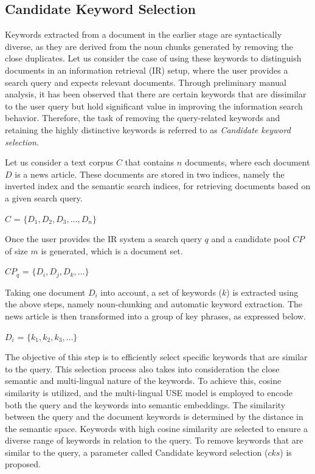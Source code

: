 \subsection{Candidate Keyword Selection}


Keywords extracted from a document in the earlier stage are syntactically diverse, as they are derived from the noun chunks generated by removing the close duplicates. Let us consider the case of using these keywords to distinguish documents in an information retrieval (IR) setup, where the user provides a search query and expects relevant documents. Through preliminary manual analysis, it has been observed that there are certain keywords that are dissimilar to the user query but hold significant value in improving the information search behavior. Therefore, the task of removing the query-related keywords and retaining the highly distinctive keywords is referred to as \textit{Candidate keyword selection}.


Let us consider a text corpus $C$ that contains $n$ documents, where each document $D$ is a news article. These documents are stored in two indices, namely the inverted index and the semantic search indices, for retrieving documents based on a given search query.


\centerline{$C$ = $\{D_1, D_2, D_3,\dots, D_n\}$}

Once the user provides the IR system a search query $q$ and a candidate pool $CP$ of size $m$ is generated, which is a document set.

\centerline{$CP_q$ = $\{D_i, D_j, D_k,\dots\}$}


Taking one document $D_i$ into account, a set of keywords ($k$) is extracted using the above steps, namely noun-chunking and automatic keyword extraction. The news article is then transformed into a group of key phrases, as expressed below.


\centerline{$D_i$ = $\{k_1, k_2, k_3,\dots\}$ } 

The objective of this step is to efficiently select specific keywords that are similar to the query. This selection process also takes into consideration the close semantic and multi-lingual nature of the keywords. To achieve this, cosine similarity is utilized, and the multi-lingual USE model is employed to encode both the query and the keywords into semantic embeddings. The similarity between the query and the document keywords is determined by the distance in the semantic space. Keywords with high cosine similarity are selected to ensure a diverse range of keywords in relation to the query. To remove keywords that are similar to the query, a parameter called Candidate keyword selection ($cks$) is proposed.



